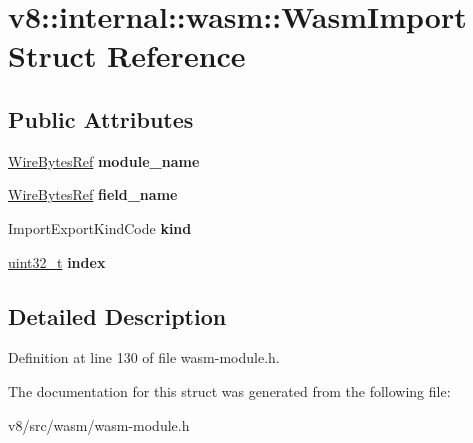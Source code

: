 \hypertarget{structv8_1_1internal_1_1wasm_1_1WasmImport}{}\section{v8\+:\+:internal\+:\+:wasm\+:\+:Wasm\+Import Struct Reference}
\label{structv8_1_1internal_1_1wasm_1_1WasmImport}
\subsection*{Public Attributes}
\begin{DoxyCompactItemize}
\item 
\mbox{\label{structv8_1_1internal_1_1wasm_1_1WasmImport_abc7923c3e7d559d1b43ff163623d9e73}} 
\mbox{\hyperlink{classv8_1_1internal_1_1wasm_1_1WireBytesRef}{Wire\+Bytes\+Ref}} {\bfseries module\+\_\+name}
\item 
\mbox{\label{structv8_1_1internal_1_1wasm_1_1WasmImport_a09d5556e0c0df3599279550d9540a109}} 
\mbox{\hyperlink{classv8_1_1internal_1_1wasm_1_1WireBytesRef}{Wire\+Bytes\+Ref}} {\bfseries field\+\_\+name}
\item 
\mbox{\label{structv8_1_1internal_1_1wasm_1_1WasmImport_a39e2b98456fa163398a6816503a4393e}} 
Import\+Export\+Kind\+Code {\bfseries kind}
\item 
\mbox{\label{structv8_1_1internal_1_1wasm_1_1WasmImport_ab96cb64f64f5a8b89291f41848cc1b3c}} 
\mbox{\hyperlink{classuint32__t}{uint32\+\_\+t}} {\bfseries index}
\end{DoxyCompactItemize}


\subsection{Detailed Description}


Definition at line 130 of file wasm-\/module.\+h.



The documentation for this struct was generated from the following file\+:\begin{DoxyCompactItemize}
\item 
v8/src/wasm/wasm-\/module.\+h\end{DoxyCompactItemize}
